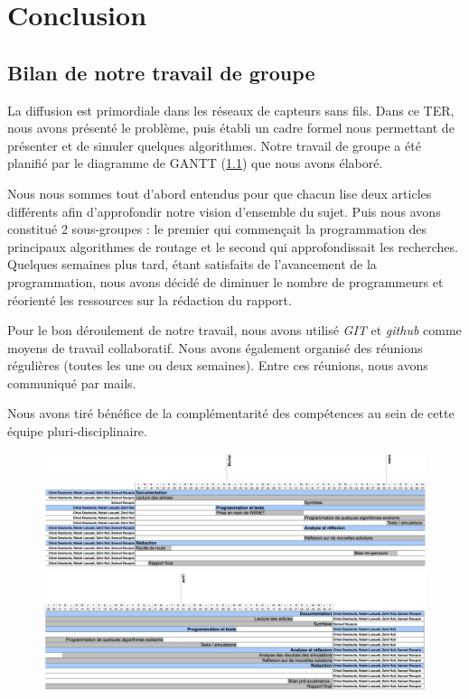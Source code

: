 
\chapter{Conclusion}\label{conclusion}

\section{Bilan de notre travail de groupe}
La diffusion est primordiale dans les réseaux de capteurs sans fils. Dans ce TER, nous avons présenté le problème, puis établi un cadre formel nous permettant de présenter et de simuler quelques algorithmes. Notre travail de groupe a été planifié par le diagramme de GANTT (\ref{GANTT}) que nous avons élaboré.

Nous nous sommes tout d'abord entendus pour que chacun lise deux articles différents afin d'approfondir notre vision d'ensemble du sujet. Puis nous avons constitué 2 sous-groupes : le premier qui commençait la programmation des principaux algorithmes de routage et le second qui approfondissait les recherches. Quelques semaines plus tard, étant satisfaits de l'avancement de la programmation, nous avons décidé de diminuer le nombre de programmeurs et réorienté les ressources sur la rédaction du rapport.

Pour le bon déroulement de notre travail, nous avons utilisé \emph{GIT} et \emph{github} comme moyens de travail collaboratif. Nous avons également organisé des réunions régulières (toutes les une ou deux semaines). Entre ces réunions, nous avons communiqué par mails.

Nous avons tiré bénéfice de la complémentarité des compétences au sein de cette équipe pluri-disciplinaire.


\begin{landscape}
\begin{figure}
\centering
\includegraphics[scale=0.98]{Conclusion/diagramme}
\includegraphics[scale=0.98]{Conclusion/diagramme2}
\label{GANTT}
\end{figure}
\end{landscape}

